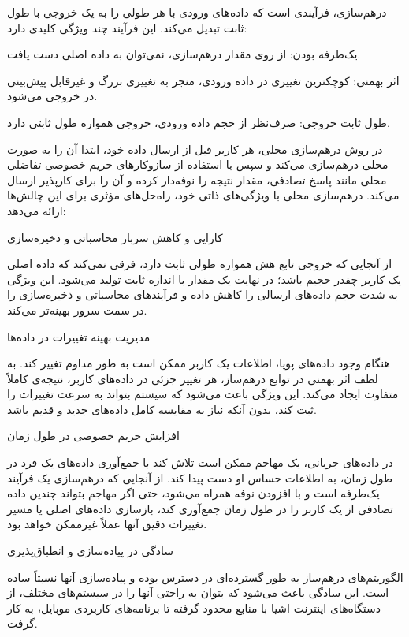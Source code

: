 
درهم‌سازی، فرآیندی است که داده‌های ورودی با هر طولی را به یک خروجی با طول ثابت تبدیل می‌کند. این فرآیند چند ویژگی کلیدی دارد:


 یک‌طرفه بودن: از روی مقدار در‌هم‌سازی، نمی‌توان به داده اصلی دست یافت.

 اثر بهمنی: کوچکترین تغییری در داده ورودی، منجر به تغییری بزرگ و غیرقابل پیش‌بینی در خروجی می‌شود.

 طول ثابت خروجی: صرف‌نظر از حجم داده ورودی، خروجی همواره طول ثابتی دارد.


در روش درهم‌سازی محلی، هر کاربر قبل از ارسال داده خود، ابتدا آن را به صورت محلی درهم‌سازی می‌کند و سپس با استفاده از سازوکارهای حریم خصوصی تفاضلی محلی مانند پاسخ تصادفی، مقدار نتیجه را نوفه‌دار کرده و آن را برای کارپذیر ارسال می‌کند. درهم‌سازی محلی با ویژگی‌های ذاتی خود، راه‌حل‌های مؤثری برای این چالش‌ها ارائه می‌دهد:


 کارایی و کاهش سربار محاسباتی و ذخیره‌سازی

از آنجایی که خروجی تابع هش همواره طولی ثابت دارد، فرقی نمی‌کند که داده اصلی یک کاربر چقدر حجیم باشد؛ در نهایت یک مقدار با اندازه ثابت تولید می‌شود. این ویژگی به شدت حجم داده‌های ارسالی را کاهش داده و فرآیندهای محاسباتی و ذخیره‌سازی را در سمت سرور بهینه‌تر می‌کند.

 مدیریت بهینه تغییرات در داده‌ها
 
هنگام وجود داده‌های پویا، اطلاعات یک کاربر ممکن است به طور مداوم تغییر کند. به لطف اثر بهمنی در توابع درهم‌ساز، هر تغییر جزئی در داده‌های کاربر، نتیجه‌ی کاملاً متفاوت ایجاد می‌کند. این ویژگی باعث می‌شود که سیستم بتواند به سرعت تغییرات را ثبت کند، بدون آنکه نیاز به مقایسه کامل داده‌های جدید و قدیم باشد.

 افزایش حریم خصوصی در طول زمان

در داده‌های جریانی، یک مهاجم ممکن است تلاش کند با جمع‌آوری داده‌های یک فرد در طول زمان، به اطلاعات حساس او دست پیدا کند. از آنجایی که درهم‌سازی یک فرآیند یک‌طرفه است و با افزودن نوفه همراه می‌شود، حتی اگر مهاجم بتواند چندین داده تصادفی از یک کاربر را در طول زمان جمع‌آوری کند، بازسازی داده‌های اصلی یا مسیر تغییرات دقیق آنها عملاً غیرممکن خواهد بود.

 سادگی در پیاده‌سازی و انطباق‌پذیری

الگوریتم‌های درهم‌ساز به طور گسترده‌ای در دسترس بوده و پیاده‌سازی آنها نسبتاً ساده است. این سادگی باعث می‌شود که بتوان به راحتی آنها را در سیستم‌های مختلف، از دستگاه‌های اینترنت اشیا با منابع محدود گرفته تا برنامه‌های کاربردی موبایل، به کار گرفت.

